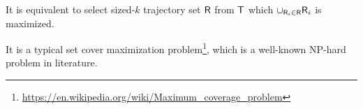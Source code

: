 It is equivalent to select sized-$k$ trajectory set $\mathsf{R}$ from $\mathsf{T}$ which $\cup_{\mathsf{R}_i \in \mathsf{R}} \mathsf{R}_i$ is maximized.

It is a typical set cover maximization problem\footnote{\url{https://en.wikipedia.org/wiki/Maximum_coverage_problem}}, which is a well-known NP-hard problem in literature.




